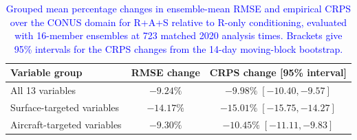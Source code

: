 \begin{table}[tbp]
\centering
\caption{\textcolor{blue}{Grouped mean percentage changes in ensemble-mean
RMSE and empirical CRPS over the CONUS domain for R+A+S relative to R-only
conditioning, evaluated with 16-member ensembles at 723 matched 2020 analysis
times. Brackets give 95\% intervals for the CRPS changes from the 14-day
moving-block bootstrap.}}
\label{tab:probabilistic_metrics}
\small
\renewcommand{\arraystretch}{1.22}
\begin{tabular*}{\textwidth}{@{\extracolsep{\fill}}lcc@{}}
\toprule
Variable group & RMSE change & CRPS change [95\% interval] \\
\midrule
All 13 variables
& $-9.24\%$ & $-9.98\%\;[-10.40,-9.57]$ \\
Surface-targeted variables
& $-14.17\%$ & $-15.01\%\;[-15.75,-14.27]$ \\
Aircraft-targeted variables
& $-9.30\%$ & $-10.45\%\;[-11.11,-9.83]$ \\
\bottomrule
\end{tabular*}
\end{table}
